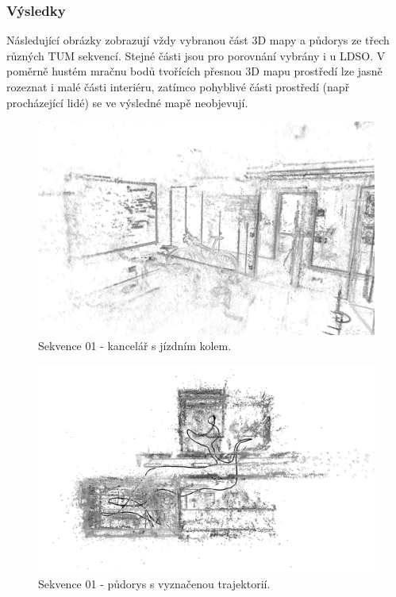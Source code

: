 \documentclass[12pt,a4paper]{article}
\begin{document}
\subsubsection*{Výsledky}
Následující obrázky zobrazují vždy vybranou část 3D mapy a půdorys ze třech různých TUM sekvencí. Stejné části jsou pro porovnání vybrány i u LDSO. V poměrně hustém mračnu bodů tvořících přesnou 3D mapu prostředí lze jasně rozeznat i malé části interiéru, zatímco pohyblivé části prostředí (např procházející lidé) se ve výsledné mapě neobjevují.

\begin{figure}[H]
\centering
\includegraphics[width=1.0\textwidth]{img/DSO_01_kolo.png}
\caption{Sekvence 01 - kancelář s jízdním kolem.}
\end{figure} 

\begin{figure}[H]
\centering
\includegraphics[width=1.0\textwidth]{img/DSO_01_top_b.png}
\caption{Sekvence 01 - půdorys s vyznačenou trajektorií.}
\end{figure} 
\end{document}
